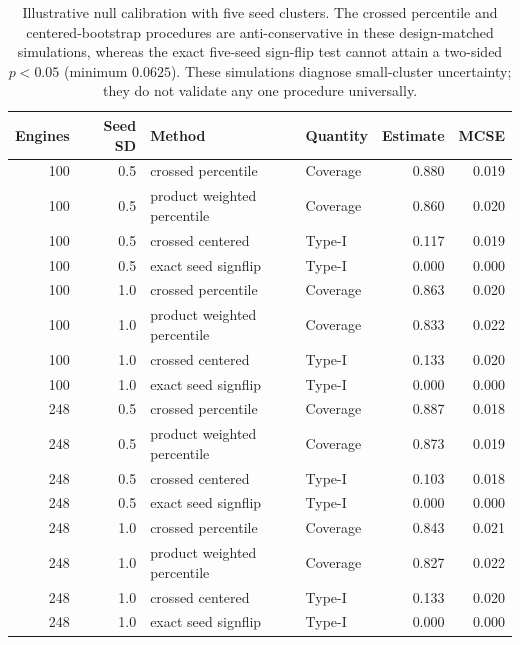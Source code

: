 \begin{table}[!t]
\centering
\scriptsize
\caption{Illustrative null calibration with five seed clusters. The crossed percentile and centered-bootstrap procedures are anti-conservative in these design-matched simulations, whereas the exact five-seed sign-flip test cannot attain a two-sided $p<0.05$ (minimum $0.0625$). These simulations diagnose small-cluster uncertainty; they do not validate any one procedure universally.}
\label{tab:small-cluster-calibration}
\begin{tabular}{rrllrr}
\toprule
Engines & Seed SD & Method & Quantity & Estimate & MCSE \\
\midrule
100 & 0.5 & crossed percentile & Coverage & 0.880 & 0.019 \\
100 & 0.5 & product weighted percentile & Coverage & 0.860 & 0.020 \\
100 & 0.5 & crossed centered & Type-I & 0.117 & 0.019 \\
100 & 0.5 & exact seed signflip & Type-I & 0.000 & 0.000 \\
100 & 1.0 & crossed percentile & Coverage & 0.863 & 0.020 \\
100 & 1.0 & product weighted percentile & Coverage & 0.833 & 0.022 \\
100 & 1.0 & crossed centered & Type-I & 0.133 & 0.020 \\
100 & 1.0 & exact seed signflip & Type-I & 0.000 & 0.000 \\
248 & 0.5 & crossed percentile & Coverage & 0.887 & 0.018 \\
248 & 0.5 & product weighted percentile & Coverage & 0.873 & 0.019 \\
248 & 0.5 & crossed centered & Type-I & 0.103 & 0.018 \\
248 & 0.5 & exact seed signflip & Type-I & 0.000 & 0.000 \\
248 & 1.0 & crossed percentile & Coverage & 0.843 & 0.021 \\
248 & 1.0 & product weighted percentile & Coverage & 0.827 & 0.022 \\
248 & 1.0 & crossed centered & Type-I & 0.133 & 0.020 \\
248 & 1.0 & exact seed signflip & Type-I & 0.000 & 0.000 \\
\bottomrule
\end{tabular}
\end{table}
